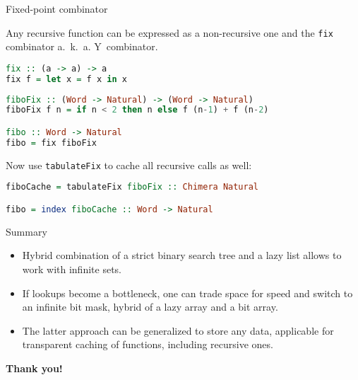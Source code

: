 \documentclass[handout]{beamer}
\begin{document}
\begin{frame}[fragile]{Fixed-point combinator}

Any recursive function can be expressed as a non-recursive one and the {\tt fix} combinator
a.~k.~a. Y~combinator.

\begin{lstlisting}[language=Haskell]
fix :: (a -> a) -> a
fix f = let x = f x in x
\end{lstlisting}

\pause

\begin{lstlisting}[language=Haskell]
fiboFix :: (Word -> Natural) -> (Word -> Natural)
fiboFix f n = if n < 2 then n else f (n-1) + f (n-2)

fibo :: Word -> Natural
fibo = fix fiboFix
\end{lstlisting}

\pause
Now use {\tt tabulateFix} to cache all recursive calls as well:

\begin{lstlisting}[language=Haskell]
fiboCache = tabulateFix fiboFix :: Chimera Natural

fibo = index fiboCache :: Word -> Natural
\end{lstlisting}

\end{frame}

\begin{frame}{Summary}

\begin{itemize}
\item Hybrid combination of a strict binary search tree and a lazy list
      allows to work with infinite sets.
\pause
\item If lookups become a bottleneck, one can trade space for speed
      and switch to an infinite bit mask,
      hybrid of a lazy array and a bit array.
\pause
\item The latter approach can be generalized to store any data, applicable
      for transparent caching of functions, including recursive ones.
\end{itemize}

\bigskip
\bigskip

\pause
\centerline{\Huge\bf Thank you!}
\end{frame}
\end{document}
